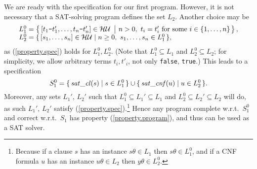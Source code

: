 \documentclass{tlp}
\newcommand*{\seq}[2][n]  {{#2_{1}, \allowbreak \ldots, \allowbreak #2_{#1}}}
\newcommand*{\mydash}{{\mbox{\tt-}}}
\newcommand*{\HU}{{\ensuremath{\cal{H U}}}\xspace}
\begin{document}
We are ready with the specification for our first program.
However, it is not necessary that a SAT-solving program defines the set $L_2$.
Another choice may be
\begin{equation}
\label{L10}
\begin{array}{l}
    L_1^0 = 
     \left
    \{\, 
    \rule{0pt}{2.ex}
[t_1\mydash t'_1,\ldots, t_n\mydash t'_n]  \in\HU
\ \left| \ 
\rule{0ex}{2ex}
n>0,
\
    t_i=t'_i \mbox{ for some } i\in \{1,\ldots,n\} \right.\right
    \},
  \\
        L_2^0 = \{\, [\seq s]\in\HU \mid n\geq0,\ \seq s\in L_1^0 \,\},
\end{array}
\end{equation}
as (\ref{property.spec}) holds for $L_1^0, L_2^0$.
(Note that  $L_1^0\subseteq L_1$ and $L_2^0\subseteq L_2$;
for simplicity, we allow arbitrary terms $t_i,t'_i$, not only 
{\tt false}, {\tt true}.)
This leads to a specification
\[
S_1^0 = \{\, {\it sat\_cl}(s) \mid s\in L_1^0\,\}
 \cup \{\, {\it sat\_c n f}(u) \mid u\in L_2^0\,\}.
\]  
Moreover, any sets 
$L_1'$, $L_2'$ such that $L_1^0\subseteq L_1'\subseteq L_1$
and $L_2^0\subseteq L_2'\subseteq L_2$ will do,
as such $L_1'$, $L_2'$ satisfy (\ref{property.spec}).\footnote{Because
   if a clause $s$ has an instance $s\theta\in L_1$ then $s\theta\in L_1^0$,
   and
   if a CNF formula $u$ has an instance $u\theta\in L_2$ then $y\theta\in L_2^0$.
} Hence any program complete w.r.t.\ $S_1^0$ and correct w.r.t.\ $S_1$ has
property (\ref{property.program}), and thus can be used as a SAT solver.
\end{document}
